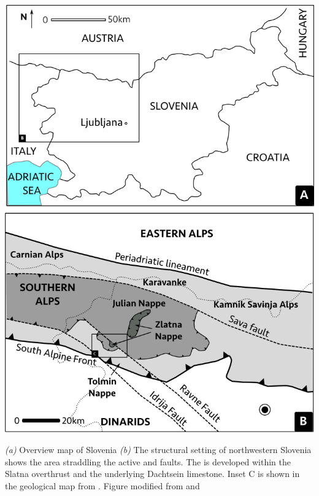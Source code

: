 \begin{map}[b!]
\checkoddpage \ifoddpage \forcerectofloat \else \forceversofloat \fi
\includegraphics[width = \textwidth]{images/maps-of-mig/geology_large.png}
\caption[Structural setting of NW Slovenia]{\emph{(a)} Overview map of Slovenia \emph{(b)} The structural setting of northwestern Slovenia shows the \protect{} area straddling the active \protect{} and \protect{} faults. The \protect{} is developed within the Slatna overthrust and the underlying Dachtsein limestone. Inset C is shown in the geological map from \citet{buser1986tolmavc}. Figure modified from \citet{vsmuc2009tectonic} and \citet{celarc2014new}}
\label{map:geol large scale}
\end{map}


 
